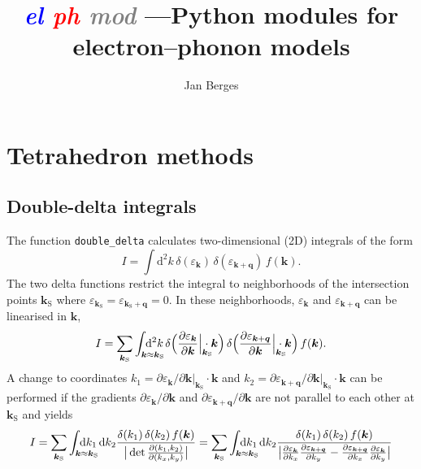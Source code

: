 \documentclass[a4paper]{article}
\title{{\ttfamily \itshape
    \textcolor{blue}{el}%
    \textcolor{red}{ph}%
    \textcolor{gray}{mod}%
    }---{\Large Python modules for electron--phonon models}}
\author{Jan Berges}
\def\D{\mathrm d}
\def\sub#1{_{\text{#1}}}
\def\from#1{_{\mathrlap{#1}}}
\let\epsilon\varepsilon
\let\vec\boldsymbol
\begin{document}
\maketitle

\section{Tetrahedron methods}

\subsection{Double-delta integrals}

The function \texttt{double\_delta} calculates two-dimensional (2D) integrals of the form
%
\begin{equation}
    I = \int \D^2 k
    \, \delta(\epsilon_{\vec k})
    \, \delta(\epsilon_{\vec k + \vec q})
    \, f(\vec k).
\end{equation}
%
The two delta functions restrict the integral to neighborhoods of the intersection points $\vec k \sub S$ where $\epsilon_{\vec k \sub S} = \epsilon_{\vec k \sub S + \vec q} = 0$. In these neighborhoods, $\epsilon_{\vec k}$ and $\epsilon_{\vec k + \vec q}$ can be linearised in $\vec k$,
%
\begin{equation}
    I = \sum_{\vec k \sub S} \int \from{\vec k \approx \vec k \sub S}
    \, \D^2 k
    \, \delta \Big(\frac{\partial \epsilon_{\vec k}}{\partial \vec k} \Big| \from{\vec k \sub S} \cdot \vec k \Big)
    \, \delta \Big(\frac{\partial \epsilon_{\vec k + \vec q}}{\partial \vec k} \Big| \from{\vec k \sub S} \cdot \vec k \Big)
    \, f(\vec k).
\end{equation}
%
A change to coordinates $k_1 = \partial \epsilon_{\vec k} / \partial \vec k |_{\vec k \sub S} \cdot \vec k$ and $k_2 = \partial \epsilon_{\vec k + \vec q} / \partial \vec k |_{\vec k \sub S} \cdot \vec k$ can be performed if the gradients $\partial \epsilon_{\vec k} / \partial \vec k$ and $\partial \epsilon_{\vec k + \vec q} / \partial \vec k$ are not parallel to each other at $\vec k \sub S$ and yields
%
\begin{equation}
    I = \sum_{\vec k \sub S} \int \from{\vec k \approx \vec k \sub S}
    \, \D k_1
    \, \D k_2
    \frac{\delta(k_1) \, \delta(k_2) \, f(\vec k)}
    {\big| \det \frac{\partial (k_1, k_2)}{\partial (k_x, k_y)} \big|}
    = \sum_{\vec k \sub S} \int \from{\vec k \approx \vec k \sub S}
    \, \D k_1
    \, \D k_2
    \frac{\delta(k_1) \, \delta(k_2) \, f(\vec k)}
    {\big|
        \frac{\partial \epsilon_{\vec k}}{\partial k_x}
        \frac{\partial \epsilon_{\vec k + \vec q}}{\partial k_y}
        -
        \frac{\partial \epsilon_{\vec k + \vec q}}{\partial k_x}
        \frac{\partial \epsilon_{\vec k}}{\partial k_y}
    \big|}
\end{equation}
\end{document}
